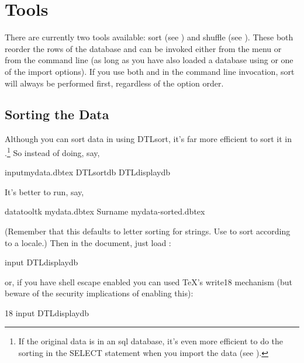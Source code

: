 \chapter{Tools}\label{sec:tools}

There are currently two tools available: sort (see )
and shuffle (see ). These both reorder the rows of the
database and can be invoked either from the  menu
or from the command line (as long as
you have also loaded a database using  or one of the
import options). If you use both  and 
in the command line invocation, sort will always be performed first, 
regardless of the option order.

\section{Sorting the Data}\label{sec:sort}

Although you can sort data in  using \gls{DTLsort}, 
it's far more efficient to sort it in .\footnote{If the original 
data is in an \gls{sql} database, it's even more efficient to 
do the sorting in the SELECT statement when you import the data (see 
).} So instead of doing, say,
\begin{codebox}
\gls{input}{mydata.dbtex}
\gls{DTLsortdb}
\gls{DTLdisplaydb}
\end{codebox}
It's better to run, say,
\begin{terminal}
\gls{datatooltk}  mydata.dbtex  Surname  mydata-sorted.dbtex
\end{terminal}
(Remember that this defaults to letter sorting for strings. Use
 to sort according to a locale.)
Then in the document, just load :
\begin{codebox}
\gls{input}
\gls{DTLdisplaydb}
\end{codebox}
or, if you have shell escape enabled you can used \TeX's 
\gls{write18} mechanism (but beware of the security implications of
enabling this):
\begin{codebox}
18
\codepar
\gls{input}
\gls{DTLdisplaydb}
\end{codebox}

